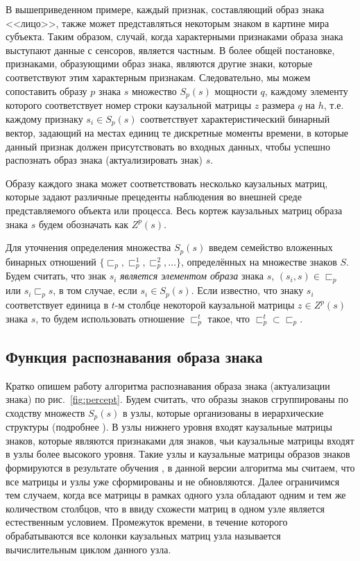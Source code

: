\documentclass[12pt]{scrartcl}
\begin{document}
	В вышеприведенном примере, каждый признак, составляющий образ знака <<лицо>>, также может представляться некоторым знаком в картине мира субъекта. Таким образом, случай, когда характерными признаками образа знака выступают данные с сенсоров, является частным. В более общей постановке, признаками, образующими образ знака, являются другие знаки, которые соответствуют этим характерным признакам. Следовательно, мы можем сопоставить образу $p$ знака $s$ множество $S_p(s)$ мощности $q$, каждому элементу которого соответствует номер строки каузальной матрицы $z$ размера $q$ на $h$, т.е. каждому признаку $s_i\in S_p(s)$ соответствует характеристический бинарный вектор, задающий на местах единиц те дискретные моменты времени, в которые данный признак должен присутствовать во входных данных, чтобы успешно распознать образ знака (актуализировать знак) $s$. 
	
	Образу каждого знака может соответствовать несколько каузальных матриц, которые задают различные прецеденты наблюдения во внешней среде представляемого объекта или процесса. Весь кортеж каузальных матриц образа знака $s$ будем обозначать как $Z^p(s)$. 
		
	Для уточнения определения множества $S_p(s)$ введем семейство вложенных бинарных отношений $\{\sqsubset_p,\sqsubset_p^1,\sqsubset_p^2,\dots\}$, определённых на множестве знаков $S$. Будем считать, что знак $s_i$ \textit{является элементом образа} знака $s$, $(s_i,s)\in\sqsubset_p$ или $s_i\sqsubset_p s$, в том случае, если $s_i\in S_p(s)$. Если известно, что знаку $s_i$ соответствует единица в $t$-м столбце некоторой каузальной матрицы $z\in Z^p(s)$ знака $s$, то будем использовать отношение $\sqsubset_p^t$ такое, что  $\sqsubset_p^t\subset \sqsubset_p$.
	
	\subsection{Функция распознавания образа знака}\label{subsec:actual}
	
	Кратко опишем работу алгоритма распознавания образа знака (актуализации знака) по рис.~\ref{fig:percept}. Будем считать, что образы знаков сгруппированы по сходству множеств $S_p(s)$ в узлы, которые организованы в иерархические структуры (подробнее \cite{Panov2014d}). В узлы нижнего уровня входят каузальные матрицы знаков, которые являются признаками для знаков, чьи каузальные матрицы входят в узлы более высокого уровня. Такие узлы и каузальные матрицы образов знаков формируются в результате обучения \cite{Panov2014d,Skrynnik2016}, в данной версии алгоритма мы считаем, что все матрицы и узлы уже сформированы и не обновляются. Далее ограничимся тем случаем, когда все матрицы в рамках одного узла обладают одним и тем же количеством столбцов, что в ввиду схожести матриц в одном узле является естественным условием. Промежуток времени, в течение которого обрабатываются все колонки каузальных матриц узла называется вычислительным циклом данного узла.
	
\end{document}
